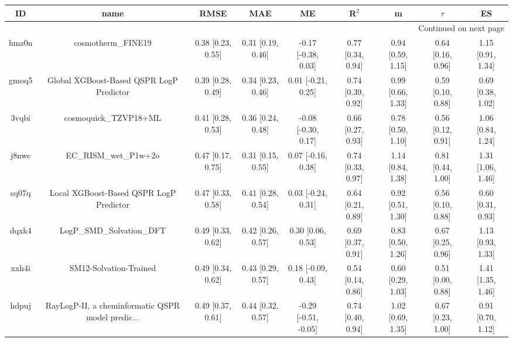 \documentclass{article}
\begin{document}
\begin{center}
\scriptsize
\begin{longtable}{|ccccccccc|}
\toprule
    ID &                                               name &               RMSE &                MAE &                    ME &              R$^2$ &                    m &               $\tau$ &                    ES \\
\midrule
\endhead
\midrule
\multicolumn{9}{r}{{Continued on next page}} \\
\midrule
\endfoot

\bottomrule
\endlastfoot
 hmz0n &                                 cosmotherm\_FINE19 &  0.38 [0.23, 0.55] &  0.31 [0.19, 0.46] &   -0.17 [-0.38, 0.03] &  0.77 [0.34, 0.94] &    0.94 [0.59, 1.15] &    0.64 [0.16, 0.96] &     1.15 [0.91, 1.34] \\
 gmoq5 &           Global XGBoost-Based QSPR LogP Predictor &  0.39 [0.28, 0.49] &  0.34 [0.23, 0.46] &    0.01 [-0.21, 0.25] &  0.74 [0.39, 0.92] &    0.99 [0.66, 1.33] &    0.59 [0.10, 0.88] &     0.69 [0.38, 1.02] \\
 3vqbi &                              cosmoquick\_TZVP18+ML &  0.41 [0.28, 0.53] &  0.36 [0.24, 0.48] &   -0.08 [-0.30, 0.17] &  0.66 [0.27, 0.93] &    0.78 [0.50, 1.10] &    0.56 [0.12, 0.91] &     1.06 [0.84, 1.24] \\
 j8nwc &                              EC\_RISM\_wet\_P1w+2o &  0.47 [0.17, 0.75] &  0.31 [0.15, 0.55] &    0.07 [-0.16, 0.38] &  0.74 [0.33, 0.97] &    1.14 [0.84, 1.38] &    0.81 [0.44, 1.00] &     1.31 [1.06, 1.46] \\
 sq07q &            Local XGBoost-Based QSPR LogP Predictor &  0.47 [0.33, 0.58] &  0.41 [0.28, 0.54] &    0.03 [-0.24, 0.31] &  0.64 [0.21, 0.89] &    0.92 [0.51, 1.30] &    0.56 [0.10, 0.88] &     0.60 [0.31, 0.93] \\
 dqxk4 &                          LogP\_SMD\_Solvation\_DFT &  0.49 [0.33, 0.62] &  0.42 [0.26, 0.57] &     0.30 [0.06, 0.53] &  0.69 [0.37, 0.91] &    0.83 [0.50, 1.26] &    0.67 [0.25, 0.96] &     1.13 [0.93, 1.33] \\
 xxh4i &                             SM12-Solvation-Trained &  0.49 [0.34, 0.62] &  0.43 [0.29, 0.57] &    0.18 [-0.09, 0.43] &  0.54 [0.14, 0.86] &    0.60 [0.29, 1.03] &    0.51 [0.00, 0.88] &     1.41 [1.35, 1.46] \\
 hdpuj &  RayLogP-II, a cheminformatic QSPR model predic... &  0.49 [0.37, 0.61] &  0.44 [0.32, 0.57] &  -0.29 [-0.51, -0.05] &  0.74 [0.40, 0.94] &    1.02 [0.69, 1.35] &    0.67 [0.23, 1.00] &     0.91 [0.70, 1.12] \\

\end{longtable}
\end{center}
\end{document}
